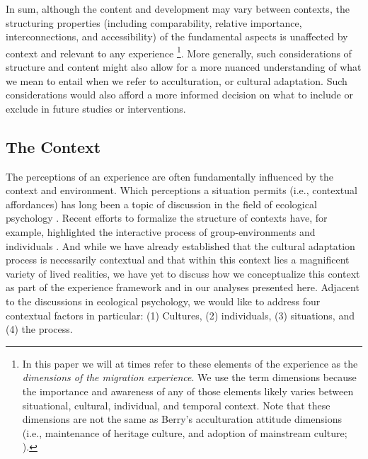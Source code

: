 \documentclass[man, 12pt, a4paper]{apa7}
\begin{document}
In sum, although the content and development may vary between contexts, the structuring properties (including comparability, relative importance, interconnections, and accessibility) of the fundamental aspects is unaffected by context and relevant to any experience \citep[also see][for a discussion of the distinction between \textit{universalism} and \textit{absolutism}]{Berry2000, Berry2009a}\footnote{In this paper we will at times refer to these elements of the experience as the \textit{dimensions of the migration experience}. We use the term dimensions because the importance and awareness of any of those elements likely varies between situational, cultural, individual, and temporal context. Note that these dimensions are not the same as Berry's acculturation attitude dimensions (i.e., maintenance of heritage culture, and adoption of mainstream culture; \citealp[e.g.,][]{Berry1989}).}.
More generally, such considerations of structure and content might also allow for a more nuanced understanding of what we mean to entail when we refer to acculturation, or cultural adaptation. Such considerations would also afford a more informed decision on what to include or exclude in future studies or interventions.

\subsection{The Context}
The perceptions of an experience are often fundamentally influenced by the context and environment. Which perceptions a situation permits (i.e., contextual affordances) has long been a topic of discussion in the field of ecological psychology \citep[e.g.,][]{Cantor1994}. Recent efforts to formalize the structure of contexts have, for example, highlighted the interactive process of group-environments and individuals \citep[e.g.,][]{Young2002}.
And while we have already established that the cultural adaptation process is necessarily contextual and that within this context lies a magnificent variety of lived realities, we have yet to discuss how we conceptualize this context as part of the experience framework and in our analyses presented here. 
Adjacent to the discussions in ecological psychology, we would like to address four contextual factors in particular: (1) Cultures, (2) individuals, (3) situations, and (4) the process.
\end{document}
